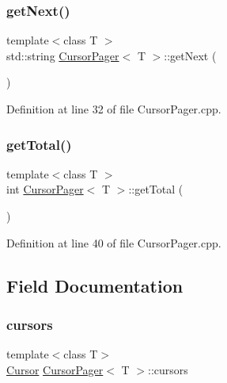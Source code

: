 \mbox{\label{class_cursor_pager_a3f2c0a7c6a44b3316b85febdc50c45ed}} 
\subsubsection{\texorpdfstring{get\+Next()}{getNext()}}
{\footnotesize\ttfamily template$<$class T $>$ \\
std\+::string \mbox{\hyperlink{class_cursor_pager}{Cursor\+Pager}}$<$ T $>$\+::get\+Next (\begin{DoxyParamCaption}{ }\end{DoxyParamCaption})}



Definition at line 32 of file Cursor\+Pager.\+cpp.

\mbox{\label{class_cursor_pager_ad083974fd3d334f7133bc5b398d23ae2}} 
\subsubsection{\texorpdfstring{get\+Total()}{getTotal()}}
{\footnotesize\ttfamily template$<$class T $>$ \\
int \mbox{\hyperlink{class_cursor_pager}{Cursor\+Pager}}$<$ T $>$\+::get\+Total (\begin{DoxyParamCaption}{ }\end{DoxyParamCaption})}



Definition at line 40 of file Cursor\+Pager.\+cpp.



\subsection{Field Documentation}
\mbox{\label{class_cursor_pager_af7befd1981dba1c4da319b8fd40de6ed}} 
\subsubsection{\texorpdfstring{cursors}{cursors}}
{\footnotesize\ttfamily template$<$class T$>$ \\
\mbox{\hyperlink{class_cursor}{Cursor}} \mbox{\hyperlink{class_cursor_pager}{Cursor\+Pager}}$<$ T $>$\+::cursors\hspace{0.3cm}{\ttfamily [private]}}



